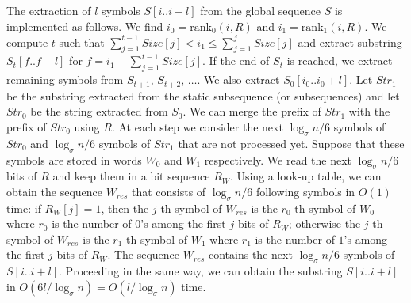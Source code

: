 \documentclass[11pt]{article}\usepackage{fullpage}
\def\idrm#1{\ensuremath{\mathrm{#1}}}
\newcommand{\ra}{\idrm{rank}}
\begin{document}
 The extraction of $l$ symbols $S[i..i+l]$ from the global sequence $S$ is implemented as follows. We find $i_0=\ra_0(i,R)$ and $i_1=\ra_1(i,R)$. We compute  $t$ such that $\sum_{j=1}^{t-1}Size[j]< i_1\le \sum_{j=1}^jSize[j]$ and extract substring $S_t[f..f+l]$ for $f=i_1-\sum_{j=1}^{t-1}Size[j]$. If the end of $S_t$ is reached, we extract remaining symbols from $S_{t+1}$, $S_{t+2}$, $\ldots$. 
We also extract $S_0[i_0..i_0+l]$. Let $Str_1$ be the substring extracted from the static subsequence (or subsequences) and let $Str_0$ be the string extracted from $S_0$. We can merge the prefix of $Str_1$ with the prefix of $Str_0$ using $R$. 
At each step we consider the next $\log_{\sigma}n/6$ symbols of $Str_0$ and $\log_{\sigma}n/6$ symbols of $Str_1$ that are not processed yet. Suppose that these symbols are stored in words $W_0$ and $W_1$ respectively.  We read the next $\log_{\sigma}n/6$ bits of $R$ and keep them in a bit sequence $R_W$. Using a look-up table, we can obtain the sequence $W_{res}$ that consists of $\log_{\sigma}n/6$ following symbols in $O(1)$ time: if $R_W[j]=1$, then the $j$-th symbol of $W_{res}$ is the $r_0$-th symbol of $W_0$ where $r_0$ is the number of $0$'s among the first $j$ bits of $R_W$; otherwise the $j$-th symbol of $W_{res}$ is the $r_1$-th symbol of $W_1$ where $r_1$ is the number of $1$'s among the first $j$ bits of $R_W$. The sequence $W_{res}$ contains the next $\log_{\sigma}n/6$ symbols of $S[i..i+l]$. Proceeding in the same way, we can obtain the substring $S[i..i+l]$ in $O(6l/\log_{\sigma}n)=O(l/\log_{\sigma}n)$ time. 
\end{document}
